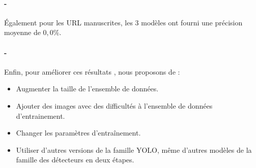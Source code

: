 \paragraph{-} Également pour les URL manuscrites, les 3 modèles ont fourni une précision moyenne de  $0,0\%$.

\paragraph{-}Enfin, pour améliorer ces résultats , nous proposons de : 
\begin{itemize}
\item Augmenter la taille de l'ensemble de données.
\item Ajouter des images avec des difficultés à l'ensemble de données d'entrainement.
\item Changer les paramètres d'entraînement.
\item Utiliser d'autres versions de la famille YOLO, même d'autres modèles de la famille des détecteurs en deux étapes.
\end{itemize}


